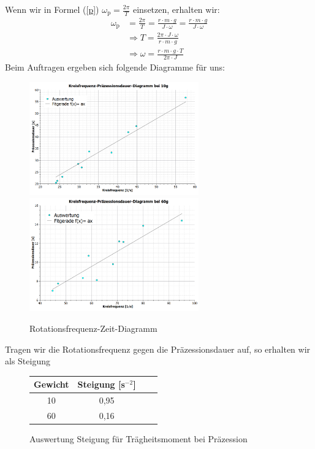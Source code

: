 \documentclass[fontsize=12pt]{scrartcl}
\begin{document}
Wenn wir in Formel (\ref{p})  $\omega_{\text{p}}=\frac{2\pi}{T}$  einsetzen, erhalten wir:
\begin{align*}
\omega_{\text{p}}&=\frac{2\pi}{T}=\frac{r \cdot m \cdot g}{J\cdot \omega} =\frac{r \cdot m \cdot g}{J\cdot \omega} \\
&\Rightarrow T= \frac{2\pi\cdot J\cdot\omega}{r\cdot m\cdot g} \\
&\Rightarrow \omega= \frac{r\cdot m\cdot g\cdot T}{2\pi\cdot J}
\end{align*}
Beim Auftragen ergeben sich folgende Diagramme für uns:
\begin{figure}[H]
\centering
\includegraphics[width=0.65\textwidth]{Graphik/10g}
\includegraphics[width=0.65\textwidth]{Graphik/60g}
\caption{Rotationsfrequenz-Zeit-Diagramm}
\end{figure}
Tragen wir die Rotationsfrequenz gegen die Präzessionsdauer auf, so erhalten wir als Steigung 
\begin{figure}[H]
\centering
\caption{Auswertung Steigung für Trägheitsmoment bei Präzession}
\begin{tabular}{|c|c|c|c|} \hline
Gewicht & Steigung [s$^{-2}$] \\ \hline
10 & 0,95 \\ \hline
60 & 0,16  \\ \hline
\end{tabular}				 
\end{figure}
\end{document}
